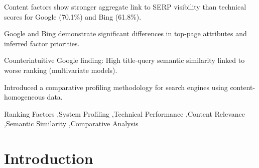 \documentclass[a4paper,fleqn]{cas-sc}
\begin{document}

\begin{highlights}
\item Content factors show stronger aggregate link to SERP visibility than technical scores for Google (70.1\%) and Bing (61.8\%).
\item Google and Bing demonstrate significant differences in top-page attributes and inferred factor priorities.
\item Counterintuitive Google finding: High title-query semantic similarity linked to worse ranking (multivariate models).
\item Introduced a comparative profiling methodology for search engines using content-homogeneous data.
\end{highlights}

\begin{keywords}
Ranking Factors \sep System Profiling \sep Technical Performance \sep Content Relevance \sep Semantic Similarity \sep Comparative Analysis
\end{keywords}


\maketitle

\section{Introduction}
\label{sec:intro}
\end{document}
